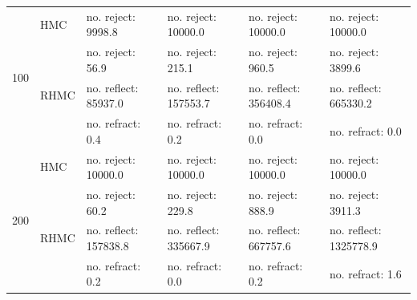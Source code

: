 \documentclass{article} %
\begin{document}
\begin {table}
\begin{tabular}{llllll}
\multirow{4}{*}{100}& HMC &  no. reject: 9998.8& no. reject: 10000.0 & no. reject: 10000.0& no. reject: 10000.0\vspace{3pt}\\
%
& \multirow{3}{*}{RHMC}& no. reject: 56.9& no. reject: 215.1& no. reject: 960.5& no. reject: 3899.6\\ 
& &        no. reflect: 85937.0& no. reflect: 157553.7& no. reflect: 356408.4& no. reflect: 665330.2\\ 
& &          no. refract: 0.4& no. refract: 0.2& no. refract: 0.0& no. refract: 0.0\vspace{12pt}\\ 
\multirow{4}{*}{200}& HMC &  no. reject: 10000.0& no. reject: 10000.0 & no. reject: 10000.0& no. reject: 10000.0\vspace{3pt}\\
%
& \multirow{3}{*}{RHMC}& no. reject: 60.2& no. reject: 229.8& no. reject: 888.9& no. reject: 3911.3\\ 
& &        no. reflect: 157838.8& no. reflect: 335667.9& no. reflect: 667757.6& no. reflect: 1325778.9\\ 
& &          no. refract: 0.2& no. refract: 0.0& no. refract: 0.2& no. refract: 1.6\vspace{12pt}\\ 
\hline \end{tabular}
\end{table}
\end{document}
